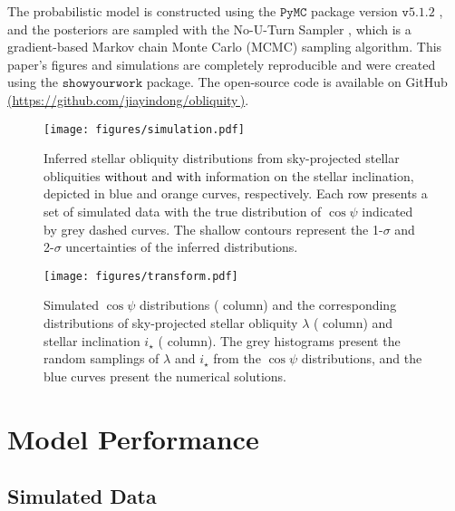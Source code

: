 \documentclass[twocolumn,times]{aastex631}
\newcommand{\edits}[1]{\textcolor{black}{#1}}
\begin{document}
The probabilistic model is constructed using the $\mathtt{PyMC}$ package version $\mathtt{v5.1.2}$ \citep{pymc}, and the posteriors are sampled with the No-U-Turn Sampler \citep[NUTS;][]{Hoffman11}, which is a gradient-based Markov chain Monte Carlo (MCMC) sampling algorithm. This paper's figures and simulations are completely reproducible and were created using the $\mathtt{showyourwork}$ package. The open-source code is available on GitHub \href{https://github.com/jiayindong/obliquity}{(https://github.com/jiayindong/obliquity\,\faGithub)}.

\begin{figure}
    \centering
    \texttt{[image: figures/simulation.pdf]}
    \caption{Inferred stellar obliquity distributions from sky-projected stellar obliquities \edits{without and with} information on the stellar inclination, depicted in blue and orange curves, respectively. Each row presents a set of simulated data with the true distribution of $\cos{\psi}$ indicated by grey dashed curves. The shallow contours represent the 1-$\sigma$ and 2-$\sigma$ uncertainties of the inferred distributions.}
    \label{fig:simulation}
\end{figure}

\begin{figure*}
    \centering
    \texttt{[image: figures/transform.pdf]}
    \caption{Simulated $\cos{\psi}$ distributions ( column) and the corresponding distributions of sky-projected stellar obliquity $\lambda$ ( column) and stellar inclination $i_\star$ ( column). The grey histograms present the random samplings of $\lambda$ and $i_\star$ from the $\cos{\psi}$ distributions, and the blue curves present the numerical solutions.}
    \label{fig:transform}
\end{figure*}

\section{Model Performance}\label{sec:simulation}

\subsection{Simulated Data}\label{subsec:sim}
\end{document}
